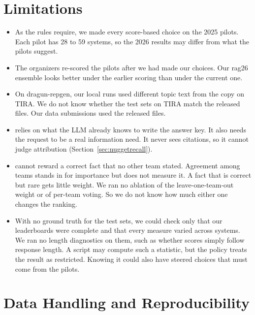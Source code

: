 \section{Limitations}

\begin{itemize}
  \item As the rules require, we made every score-based choice on the 2025 pilots.
    Each pilot has 28 to 59 systems, so the 2026 results may differ from what the
    pilots suggest.
  \item The organizers re-scored the pilots after we had made our choices. Our
    rag26 ensemble looks better under the earlier scoring than under the current
    one.
  \item On dragun-repgen, our local runs used different topic text from the copy on
    TIRA. We do not know whether the test sets on TIRA match the released files.
    Our data submissions used the released files.
  \item {} relies on what the LLM already knows to write the answer
    key. It also needs the request to be a real information need. It never sees
    citations, so it cannot judge attribution (Section~\ref{sec:nuggetrecall}).
  \item {} cannot reward a correct fact that no other team stated.
    Agreement among teams stands in for importance but does not measure it. A fact
    that is correct but rare gets little weight. We ran no ablation of the leave-one-team-out weight or of per-team voting. So we do not know how much either one changes the ranking.
  \item With no ground truth for the test sets, we could check only that our
    leaderboards were complete and that every measure varied across systems. We ran
    no length diagnostics on them, such as whether scores simply follow response
    length. A script may compute such a statistic, but the policy treats the result
    as restricted. Knowing it could also have steered choices that must come from
    the pilots.
\end{itemize}

\section{Data Handling and Reproducibility}
\label{sec:disclosure}

